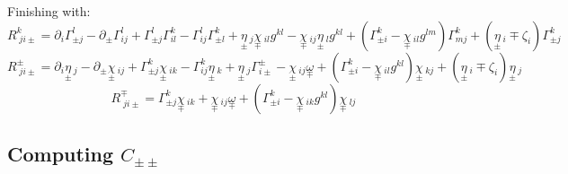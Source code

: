 \documentclass[a4paper,11pt]{article}
\numberwithin{equation}{section}
\theoremstyle{definition}
\begin{document}
Finishing with:
\begin{equation}
    \boxed{R^k_{\;ji\pm} \!=\! \partial_i\Gamma_{\pm j}^l
    \!-\! \partial_\pm \Gamma_{i j}^l
    \!+\! \Gamma_{\pm j}^l\Gamma_{il}^k
    \!-\! \Gamma_{i j}^l\Gamma_{\pm l}^k
    \!+\! \underset{\pm}{\eta}\,_j\underset{\mp}{\chi}\,_{il}g^{kl}
    \!-\! \underset{\mp}{\chi}\,_{ij}\underset{\pm}{\eta}\,_lg^{kl}
    \!+\! (\Gamma_{\pm i}^k
    \!-\! \underset{\mp}{\chi}\,_{il}g^{lm}) \Gamma_{mj}^k
    \!+\! (\underset{\pm}{\eta}\,_i \mp \zeta_i) \Gamma_{\pm j}^k }
\end{equation}
\begin{equation}
    \boxed{R^\pm_{\;ji\pm} = \partial_i\underset{\pm}{\eta}\,_j - \partial_\pm \underset{\pm}{\chi}\,_{ij} + \Gamma_{\pm j}^k\underset{\pm}{\chi}\,_{ik} - \Gamma_{i j}^k\underset{\pm}{\eta}\,_k + \underset{\pm}{\eta}\,_j\Gamma_{i\pm}^\pm - \underset{\pm}{\chi}\,_{ij}\underset{\mp}{\omega} + (\Gamma_{\pm i}^k - \underset{\mp}{\chi}\,_{il}g^{kl})\underset{\pm}{\chi}\,_{k j} +(\underset{\pm}{\eta}\,_i \mp \zeta_i)\underset{\pm}{\eta}\,_j}
\end{equation}
\begin{equation}
    \boxed{R^\mp_{\;ji\pm} =  \Gamma_{\pm j}^k\underset{\mp}{\chi}\,_{ik} + \underset{\mp}{\chi}\,_{ij}\underset{\mp}{\omega} + (\Gamma_{\pm i}^k - \underset{\mp}{\chi}\,_{ik}g^{kl})\underset{\mp}{\chi}\,_{l j}}
\end{equation}

\subsection{Computing $C_{\pm\pm}$}
\end{document}
